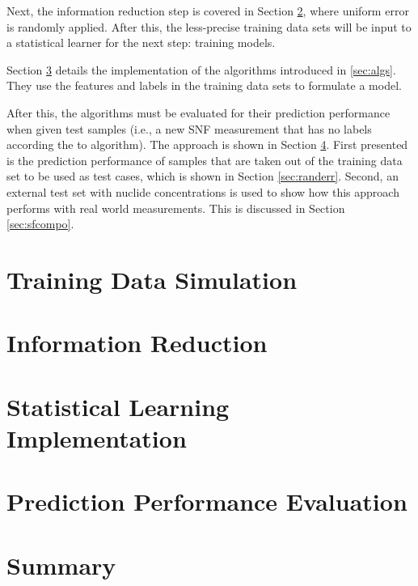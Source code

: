 Next, the information reduction step is covered in Section
\ref{sec:inforeduc1}, where uniform error is randomly applied. After this, the
less-precise training data sets will be input to a statistical learner for the
next step: training models.

Section \ref{sec:statmodel1} details the implementation of the algorithms
introduced in \ref{sec:algs}. They use the features and labels in the training
data sets to formulate a model. 

After this, the algorithms must be evaluated for their prediction performance
when given test samples (i.e., a new \gls{SNF} measurement that has no labels
according the to algorithm).  The approach is shown in Section \ref{sec:eval1}.
First presented is the prediction performance of samples that are taken out of
the training data set to be used as test cases, which is shown in Section
\ref{sec:randerr}.  Second, an external test set with nuclide concentrations is
used to show how this approach performs with real world measurements. This is
discussed in Section \ref{sec:sfcompo}.  

\section{Training Data Simulation}
\label{sec:training1}


\section{Information Reduction}
\label{sec:inforeduc1}


\section{Statistical Learning Implementation}
\label{sec:statmodel1}


\section{Prediction Performance Evaluation}
\label{sec:eval1}


\section{Summary}

